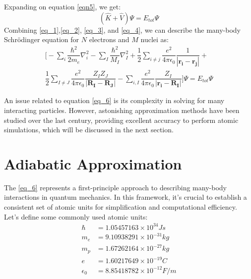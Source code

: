 Expanding on equation \ref{eqn5}, we get:
\begin{equation} \label{eq_5}
    \left(\hat{K} + \hat{V}\right) \Psi = E_{tot} \Psi
\end{equation}
Combining \ref{eq_1},\ref{eq_2}, \ref{eq_3}, and \ref{eq_4}, we can describe the many-body Schrödinger equation for $N$ electrons and $M$ nuclei as:
\begin{equation} \label{eq_6}
\begin{split}
    \Biggl[-\sum_{i}\dfrac{\hbar^{2}}{2m_{e}}\nabla_{i}^{2} -\sum_{I} \dfrac{\hbar ^{2}}{M_I} \nabla_{I}^{2}+ \dfrac{1}{2}\sum_{i\neq j}\dfrac{e^{2}}{4\pi\epsilon_{0} }\dfrac{1}{|\mathbf{r_i}-\mathbf{r_j}|}+\\
    \dfrac{1}{2}\sum_{I\neq J}\dfrac{e^{2}}{4\pi\epsilon_{0}}\dfrac{Z_I Z_J}{|\mathbf{R_I}-\mathbf{R_J}|}  -\sum_{i,I}\dfrac{e^{2}}{4\pi\epsilon_{0}}\dfrac{Z_I}{|\mathbf{r_i}-\mathbf{R_I}|}\Biggr] \Psi = E_{tot} \Psi
\end{split}
\end{equation}

An issue related to equation \ref{eq_6} is its complexity in solving for many interacting particles. However, astonishing approximation methods have been studied over the last century, providing excellent accuracy to perform atomic simulations, which will be discussed in the next section.

\section{Adiabatic Approximation}
\label{section.adiabatic_approximation}
The \ref{eq_6} represents a first-principle approach to describing many-body interactions in quantum mechanics. In this framework, it's crucial to establish a consistent set of atomic units for simplification and computational efficiency. Let's define some commonly used
atomic units:
\begin{equation*}
\begin{split}
    \hbar&= 1.05457163 \times 10^{34} Js \\
    m_e  &= 9.10938291 \times 10^{-31} kg \\
    m_p  &= 1.67262164 \times 10^{-27} kg \\
    e    &= 1.60217649 \times 10^{-19} C \\
    \epsilon_{0} &= 8.85418782 \times 10^{-12} F/m
\end{split}
\end{equation*}

